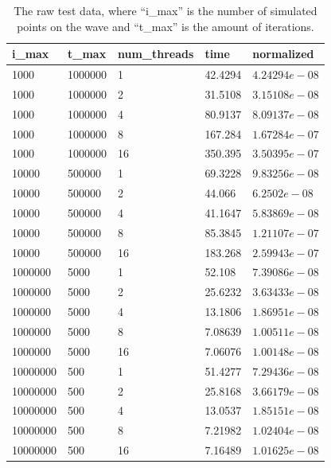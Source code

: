 \documentclass[a4paper]{article}
\begin{document}
\begin{table}[htbp]
    \centering
    \begin{tabular}{|l|l|l|l|l|}
        \hline
        i\_max    & t\_max   & num\_threads & time    & normalized \\
        \hline
        1000     & 1000000 & 1           & 42.4294 & $4.24294e-08$ \\
        1000     & 1000000 & 2           & 31.5108 & $3.15108e-08$ \\
        1000     & 1000000 & 4           & 80.9137 & $8.09137e-08$ \\
        1000     & 1000000 & 8           & 167.284 & $1.67284e-07$ \\
        1000     & 1000000 & 16          & 350.395 & $3.50395e-07$ \\
        10000    & 500000  & 1           & 69.3228 & $9.83256e-08$ \\
        10000    & 500000  & 2           & 44.066  &  $6.2502e-08$ \\
        10000    & 500000  & 4           & 41.1647 & $5.83869e-08$ \\
        10000    & 500000  & 8           & 85.3845 & $1.21107e-07$ \\
        10000    & 500000  & 16          & 183.268 & $2.59943e-07$ \\
        1000000  & 5000    & 1           & 52.108  & $7.39086e-08$ \\
        1000000  & 5000    & 2           & 25.6232 & $3.63433e-08$ \\
        1000000  & 5000    & 4           & 13.1806 & $1.86951e-08$ \\
        1000000  & 5000    & 8           & 7.08639 & $1.00511e-08$ \\
        1000000  & 5000    & 16          & 7.06076 & $1.00148e-08$ \\
        10000000 & 500     & 1           & 51.4277 & $7.29436e-08$ \\
        10000000 & 500     & 2           & 25.8168 & $3.66179e-08$ \\
        10000000 & 500     & 4           & 13.0537 & $1.85151e-08$ \\
        10000000 & 500     & 8           & 7.21982 & $1.02404e-08$ \\
        10000000 & 500     & 16          & 7.16489 & $1.01625e-08$ \\
        \hline
    \end{tabular}
    \caption{The raw test data, where ``i\_max'' is the number of simulated points
    on the wave and ``t\_max'' is the amount of iterations.}
    \label{table:results}
\end{table}
\end{document}
